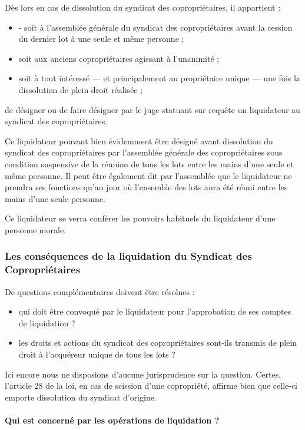 			Dès lors en cas de dissolution du syndicat des copropriétaires, il appartient :
			\begin{itemize}
				\item - soit à l’assemblée générale du syndicat des copropriétaires avant la cession du dernier lot à une seule et même personne ;
				\item soit aux anciens copropriétaires agissant à l’unanimité ;
				\item soit à tout intéressé --- et principalement au propriétaire unique --- une fois la dissolution de plein droit réalisée ;		
			\end{itemize}
			de désigner ou de faire désigner par le juge statuant sur requête un liquidateur au syndicat des copropriétaires.
			
			Ce liquidateur pouvant bien évidemment être désigné avant dissolution du syndicat des copropriétaires par l’assemblée générale des copropriétaires sous condition suspensive de la réunion de tous les lots entre les mains d’une seule et même personne. Il peut être également dit par l’assemblée que le liquidateur ne prendra ses fonctions qu’au jour où l’ensemble des lots aura été réuni entre les mains d’une seule personne.

			Ce liquidateur se verra conférer les pouvoirs habituels du liquidateur d’une personne morale.
		
		\subsubsection{Les conséquences de la liquidation du Syndicat des Copropriétaires}
		
			De questions complémentaires doivent être résolues :
			\begin{itemize}
				\item qui doit être convoqué par le liquidateur pour l’approbation de ses comptes de liquidation ?
				\item les droits et actions du syndicat des copropriétaires sont-ils transmis de plein droit à l’acquéreur unique de tous les lots ?
			\end{itemize}
			Ici encore nous ne disposions d’aucune jurisprudence sur la question. Certes, l’article 28 de la loi, en cas de scission d’une copropriété, affirme bien que celle-ci emporte dissolution du syndicat d’origine.
			
			\paragraph{Qui est concerné par les opérations de liquidation ?}
			
